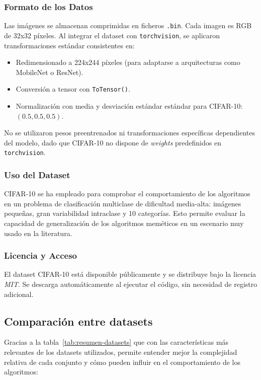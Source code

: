 \subsubsection{Formato de los Datos}
Las imágenes se almacenan comprimidas en ficheros \texttt{.bin}.
Cada imagen es RGB de 32x32 píxeles.
Al integrar el dataset con \texttt{torchvision}, se aplicaron transformaciones estándar consistentes en:
\begin{itemize}
    \item Redimensionado a 224x244 píxeles (para adaptarse a arquitecturas como MobileNet o ResNet).
    \item Conversión a tensor con \texttt{ToTensor()}.
    \item Normalización con media y desviación estándar estándar para CIFAR-10: $(0.5, 0.5, 0.5)$.
\end{itemize}

No se utilizaron pesos preentrenados ni transformaciones específicas dependientes del modelo, dado que CIFAR-10 no dispone de \textit{weights} predefinidos en \texttt{torchvision}.

\subsubsection{Uso del Dataset}
CIFAR-10 se ha empleado para comprobar el comportamiento de los algoritmos en un problema de clasificación multiclase de dificultad media-alta:
imágenes pequeñas, gran variabilidad intraclase y 10 categorías.
Esto permite evaluar la capacidad de generalización de los algoritmos meméticos en un escenario muy usado en la literatura.

\subsubsection{Licencia y Acceso}
El dataset CIFAR-10 está disponible públicamente y se distribuye bajo la licencia \emph{MIT}.
Se descarga automáticamente al ejecutar el código, sin necesidad de registro adicional.


\subsection{Comparación entre datasets}\label{subsec:comparacion-entre-datasets}
Gracias a la tabla~\ref{tab:resumen-datasets} que con las características más relevantes de los datasets utilizados,
permite entender mejor la complejidad relativa de cada conjunto y cómo pueden influir en el comportamiento de los algoritmos:

